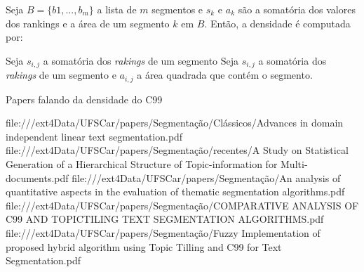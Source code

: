
















Seja $B = \{b1,...,b_m\}$ a lista de $m$ segmentos e $s_k$ e $a_k$ são a somatória dos valores dos rankings e a área de um segmento $k$ em $B$. Então, a densidade é computada por: 



Seja $s_{i,j}$ a somatória dos \textit{rakings} de um segmento 
Seja $s_{i,j}$ a somatória dos \textit{rakings} de um segmento e $a_{i,j}$ a área quadrada que contém o segmento. 





Papers falando da densidade do C99

file:///ext4Data/UFSCar/papers/Segmentação/Clássicos/Advances in domain independent linear text segmentation.pdf
file:///ext4Data/UFSCar/papers/Segmentação/recentes/A Study on Statistical Generation of a Hierarchical Structure of Topic-information for Multi-documents.pdf
file:///ext4Data/UFSCar/papers/Segmentação/An analysis of quantitative aspects in the evaluation of thematic segmentation algorithms.pdf
file:///ext4Data/UFSCar/papers/Segmentação/COMPARATIVE ANALYSIS OF C99 AND TOPICTILING TEXT SEGMENTATION ALGORITHMS.pdf
file:///ext4Data/UFSCar/papers/Segmentação/Fuzzy Implementation of proposed hybrid algorithm using Topic Tilling and C99 for Text Segmentation.pdf
































